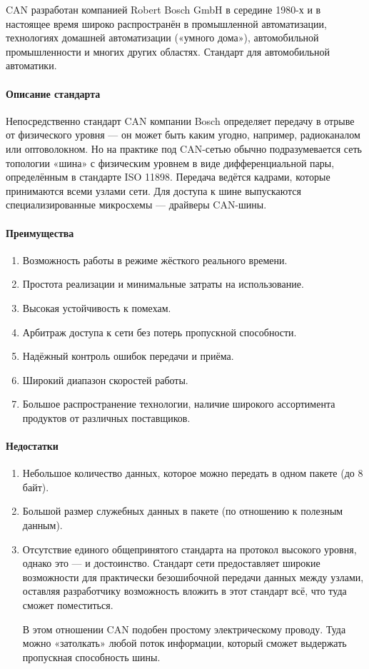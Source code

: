 \documentclass[a4paper,14pt]{extarticle}
\begin{document}
CAN разработан компанией Robert Bosch GmbH в середине 1980-х и в настоящее время широко распространён в промышленной автоматизации, технологиях домашней автоматизации («умного дома»), автомобильной промышленности и многих других областях. Стандарт для автомобильной автоматики.

\paragraph*{Описание стандарта}
Непосредственно стандарт CAN компании Bosch определяет передачу в отрыве от физического уровня — он может быть каким угодно, например, радиоканалом или оптоволокном. Но на практике под CAN-сетью обычно подразумевается сеть топологии «шина» с физическим уровнем в виде дифференциальной пары, определённым в стандарте ISO 11898. Передача ведётся кадрами, которые принимаются всеми узлами сети. Для доступа к шине выпускаются специализированные микросхемы — драйверы CAN-шины.

\paragraph*{Преимущества}
\begin{enumerate}
	\item Возможность работы в режиме жёсткого реального времени.
	\item Простота реализации и минимальные затраты на использование.
	\item Высокая устойчивость к помехам.
	\item Арбитраж доступа к сети без потерь пропускной способности.
	\item Надёжный контроль ошибок передачи и приёма.
	\item Широкий диапазон скоростей работы.
	\item Большое распространение технологии, наличие широкого ассортимента продуктов от различных поставщиков.
\end{enumerate}

\newpage
\paragraph*{Недостатки}
\begin{enumerate}
	\item Небольшое количество данных, которое можно передать в одном пакете (до 8 байт).
	\item Большой размер служебных данных в пакете (по отношению к полезным данным).
	\item Отсутствие единого общепринятого стандарта на протокол высокого уровня, однако это --- и достоинство. Стандарт сети предоставляет широкие возможности для практически безошибочной передачи данных между узлами, оставляя разработчику возможность вложить в этот стандарт всё, что туда сможет поместиться. 
	
	В этом отношении CAN подобен простому электрическому проводу. Туда можно «затолкать» любой поток информации, который сможет выдержать пропускная способность шины.
	
\end{enumerate}
\end{document}
